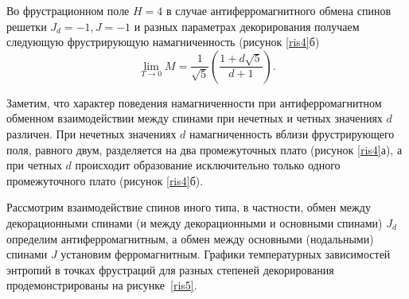 Во фрустрационном поле $H=4$ в случае антиферромагнитного обмена спинов решетки \mbox{$J_d=-1, J=-1$} и разных параметрах декорирования получаем следующую фрустрирующую намагниченность (рисунок \ref{ris4}б)
\begin{equation}
\lim_{T \rightarrow 0} M = \frac{1}{\sqrt{5}}\left(\frac{1+d\sqrt{5}}{d+1}\right).
\label{26d}
\end{equation}

Заметим, что характер поведения намагниченности при антиферромагнитном обменном взаимодействии между спинами при нечетных и четных значениях $d$ различен. При нечетных значениях $d$ намагниченность вблизи фрустрирующего поля, равного двум, разделяется на два промежуточных плато (рисунок \ref{ris4}а), а при четных $d$ происходит образование исключительно только одного промежуточного плато (рисунок \ref{ris4}б).


Рассмотрим взаимодействие спинов иного типа, в частности, обмен между декорационными спинами (и между декорационными и основными спинами) $J_d$ определим антиферромагнитным, а обмен между основными (нодальными) спинами $J$ установим ферромагнитным. Графики температурных зависимостей энтропий в точках фрустраций для разных степеней декорирования продемонстрированы на рисунке~\ref{ris5}.


